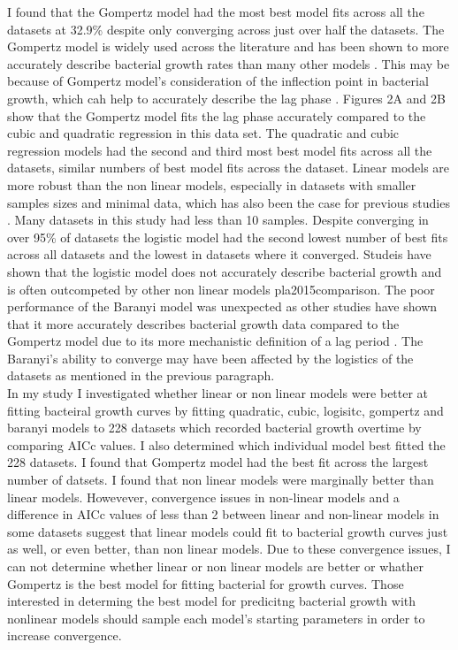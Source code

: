 \documentclass[titlepage]{article}
\begin{document}
I found that the Gompertz model had the most best model fits across all the datasets at 32.9\% despite only converging across just over half the datasets. The Gompertz model is widely used across the literature \cite{tjorve2017use} and has been shown to more accurately describe bacterial growth rates than many other models \cite{pla2015comparison, grijspeerdt1999estimating}. This may be because of Gompertz model's consideration of the inflection point in bacterial growth, which cah help to accurately describe the lag phase \cite{baranyi1994dynamic}. Figures 2A and 2B show that the Gompertz model fits the lag phase accurately compared to the cubic and quadratic regression in this data set. The quadratic and cubic regression models had the second and third most best model fits across all the datasets, similar numbers of best model fits across the dataset. Linear models are more robust than the non linear models,  especially in datasets with smaller samples sizes and minimal data, which has also been the case for previous studies \cite{baranyi1994dynamic}. Many datasets in this study had less than 10 samples. Despite converging in over 95\% of datasets the logistic model had the second lowest number of best fits across all datasets and the lowest in datasets where it converged. Studeis have shown that the logistic model does not accurately describe bacterial growth \cite{smith2007bacterial} and is often outcompeted by other non linear models {pla2015comparison}.
The poor performance of the Baranyi model was unexpected as other studies have shown that it more accurately describes bacterial growth data compared to the Gompertz model due to its more mechanistic definition of a lag period \cite{baranyi1993modeling, baranyi1994dynamic, pla2015comparison}. The Baranyi's ability to converge may have been affected by the logistics of the datasets as mentioned in the previous paragraph. \\



In my study I investigated whether linear or non linear models were better at fitting bacteiral growth curves by fitting quadratic, cubic, logisitc, gompertz and baranyi models to 228 datasets which recorded bacterial growth overtime by comparing AICc values. I also determined which individual model best fitted the 228 datasets. I found that Gompertz model had the best fit across the largest number of datsets. I found that non linear models were marginally better than linear models. Howevever, convergence issues in non-linear models and a difference in AICc values of less than 2 between linear and non-linear models in some datasets suggest that linear models could fit to bacterial growth curves just as well, or even better, than non linear models. Due to these convergence issues, I can not determine whether linear or non linear models are better or whather Gompertz is the best model for fitting bacterial for growth curves. Those interested in determing the best model for predicitng bacterial growth with nonlinear models should sample each model's starting parameters in order to increase convergence. \\
\end{document}
